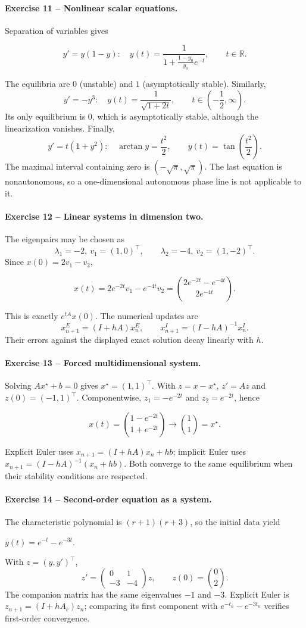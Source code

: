 \documentclass[10pt]{article}
\newcommand{\R}{\mathbb{R}}
\newcommand{\solution}[1]{\begin{tcolorbox}[breakable,colback=ResultBlue!3,colframe=ResultBlue,
  boxrule=0.8pt,arc=1mm,title=\textbf{Result},fonttitle=\bfseries]#1\end{tcolorbox}}
\begin{document}
\paragraph{Exercise 11 -- Nonlinear scalar equations.}
Separation of variables gives
\solution{\[
y'=y(1-y):\quad
y(t)=\frac{1}{1+\frac{1-y_0}{y_0}e^{-t}},\qquad t\in\R.
\]}
The equilibria are $0$ (unstable) and $1$ (asymptotically stable). Similarly,
\[
y'=-y^3:\quad y(t)=\frac{1}{\sqrt{1+2t}},
\qquad t\in\left(-\frac12,\infty\right).
\]
Its only equilibrium is $0$, which is asymptotically stable, although the
linearization vanishes. Finally,
\[
y'=t(1+y^2):\quad \arctan y=\frac{t^2}{2},\qquad
y(t)=\tan\left(\frac{t^2}{2}\right).
\]
The maximal interval containing zero is $(-\sqrt\pi,\sqrt\pi)$. The last
equation is nonautonomous, so a one-dimensional autonomous phase line is not
applicable to it.

\paragraph{Exercise 12 -- Linear systems in dimension two.}
The eigenpairs may be chosen as
\[
\lambda_1=-2,\ v_1=(1,0)^\top,\qquad
\lambda_2=-4,\ v_2=(1,-2)^\top.
\]
Since $x(0)=2v_1-v_2$,
\solution{\[
x(t)=2e^{-2t}v_1-e^{-4t}v_2
=\binom{2e^{-2t}-e^{-4t}}{2e^{-4t}}.
\]}
This is exactly $e^{tA}x(0)$. The numerical updates are
\[
x_{n+1}^{E}=(I+hA)x_n^E,
\qquad x_{n+1}^{I}=(I-hA)^{-1}x_n^I.
\]
Their errors against the displayed exact solution decay linearly with $h$.

\paragraph{Exercise 13 -- Forced multidimensional system.}
Solving $Ax^\star+b=0$ gives $x^\star=(1,1)^\top$. With
$z=x-x^\star$, $z'=Az$ and $z(0)=(-1,1)^\top$. Componentwise,
$z_1=-e^{-2t}$ and $z_2=e^{-2t}$, hence
\solution{\[
x(t)=\binom{1-e^{-2t}}{1+e^{-2t}}\longrightarrow\binom11=x^\star.
\]}
Explicit Euler uses $x_{n+1}=(I+hA)x_n+hb$; implicit Euler uses
$x_{n+1}=(I-hA)^{-1}(x_n+hb)$. Both converge to the same equilibrium when
their stability conditions are respected.

\paragraph{Exercise 14 -- Second-order equation as a system.}
The characteristic polynomial is $(r+1)(r+3)$, so the initial data yield
\solution{$\displaystyle y(t)=e^{-t}-e^{-3t}$.}
With $z=(y,y')^\top$,
\[
z'=\begin{pmatrix}0&1\\-3&-4\end{pmatrix}z,
\qquad z(0)=\binom02.
\]
The companion matrix has the same eigenvalues $-1$ and $-3$. Explicit Euler
is $z_{n+1}=(I+hA_c)z_n$; comparing its first component with
$e^{-t_n}-e^{-3t_n}$ verifies first-order convergence.
\end{document}
